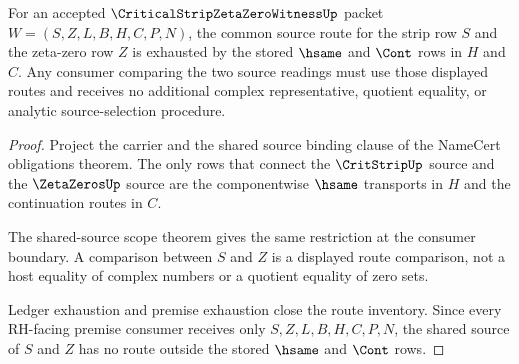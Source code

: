 \begin{theorem}
\label{thm:critical-strip-zeta-zero-source-route-exhaustion}
For an accepted $\CriticalStripZetaZeroWitnessUp$ packet $W=(S,Z,L,B,H,C,P,N)$, the common source route for the strip row $S$ and the zeta-zero row $Z$ is exhausted by the stored $\hsame$ and $\Cont$ rows in $H$ and $C$. Any consumer comparing the two source readings must use those displayed routes and receives no additional complex representative, quotient equality, or analytic source-selection procedure.
\end{theorem}
\begin{proof}
Project the carrier and the shared source binding clause of the NameCert obligations theorem. The only rows that connect the $\CritStripUp$ source and the $\ZetaZerosUp$ source are the componentwise $\hsame$ transports in $H$ and the continuation routes in $C$.

The shared-source scope theorem gives the same restriction at the consumer boundary. A comparison between $S$ and $Z$ is a displayed route comparison, not a host equality of complex numbers or a quotient equality of zero sets.

Ledger exhaustion and premise exhaustion close the route inventory. Since every RH-facing premise consumer receives only $S,Z,L,B,H,C,P,N$, the shared source of $S$ and $Z$ has no route outside the stored $\hsame$ and $\Cont$ rows.
\end{proof}

